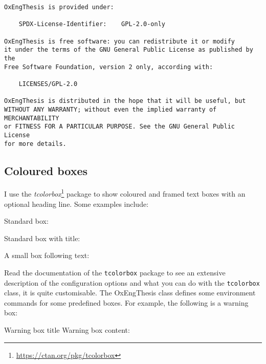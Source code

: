 \begin{lstlisting}[style=custom-verbatim,caption={License information.}]
OxEngThesis is provided under:

    SPDX-License-Identifier:    GPL-2.0-only
    
OxEngThesis is free software: you can redistribute it or modify
it under the terms of the GNU General Public License as published by the
Free Software Foundation, version 2 only, according with:

    LICENSES/GPL-2.0

OxEngThesis is distributed in the hope that it will be useful, but
WITHOUT ANY WARRANTY; without even the implied warranty of MERCHANTABILITY
or FITNESS FOR A PARTICULAR PURPOSE. See the GNU General Public License
for more details.
\end{lstlisting}


\subsection{Coloured boxes}


I use the \textit{tcolorbox}\footnote{\url{https://ctan.org/pkg/tcolorbox}} package to show coloured and framed text boxes with an optional heading line. Some examples include:

\noindent Standard box:


\begin{tcolorbox}
\lipsum[1]
\end{tcolorbox}


\noindent Standard box with title:


\begin{tcolorbox}[title=Box title]
\lipsum[1]
\end{tcolorbox}


\noindent A small box following text:\dotfill{}\hfill


Read the documentation of the \verb|tcolorbox| package to see an extensive description of the configuration options and what you can do with the \verb|tcolorbox| class, it is quite customisable. The OxEngThesis class defines some environment commands for some predefined boxes. For example, the following is a warning box:


\begin{OxWarningBox}{Warning box title}
Warning box content: \lipsum[1]
\end{OxWarningBox}


